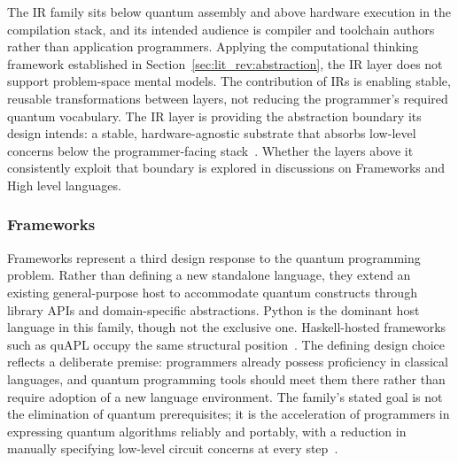 The IR family sits below quantum assembly and above hardware execution in the compilation stack, and its intended audience is compiler and toolchain authors rather than application programmers.
Applying the computational thinking framework established in Section~\ref{sec:lit_rev:abstraction}, the IR layer does not support problem-space mental models.
The contribution of IRs is enabling stable, reusable transformations between layers, not reducing the programmer's required quantum vocabulary.
The IR layer is providing the abstraction boundary its design intends: a stable, hardware-agnostic substrate that absorbs low-level concerns below the programmer-facing stack~\cite{irreview2024, qiralliance_spec}.
Whether the layers above it consistently exploit that boundary is explored in discussions on Frameworks and High level languages.

\subsubsection{Frameworks}\label{subsubsec:lit_rev:qpl:frameworks}
Frameworks represent a third design response to the quantum programming problem.
Rather than defining a new standalone language, they extend an existing general-purpose host to accommodate quantum constructs through library APIs and domain-specific abstractions.
Python is the dominant host language in this family, though not the exclusive one.
Haskell-hosted frameworks such as quAPL occupy the same structural position~\cite{corralesgarro2025productivityexpressiveness}.
The defining design choice reflects a deliberate premise: programmers already possess proficiency in classical languages, and quantum programming tools should meet them there rather than require adoption of a new language environment.
The family's stated goal is not the elimination of quantum prerequisites; it is the acceleration of programmers in expressing quantum algorithms reliably and portably, with a reduction in manually specifying low-level circuit concerns at every step~\cite{corralesgarro2025productivityexpressiveness}.

